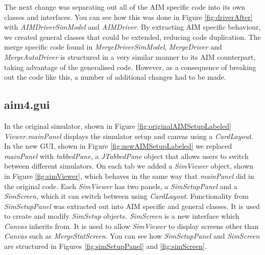 The next change was separating out all of the AIM specific code into its own classes and interfaces. You can see how this was done in Figure \ref{fig:driverAfter} with \emph{AIMDriverSimModel} and \emph{AIMDriver}. By extracting AIM specific behaviour, we created general classes that could be extended, reducing code duplication. The merge specific code found in \emph{MergeDriverSimModel}, \emph{MergeDriver} and \emph{MergeAutoDriver} is structured in a very similar manner to its AIM counterpart, taking advantage of the generalised code. However, as a consequence of breaking out the code like this, a number of additional changes had to be made. 


\subsection{aim4.gui}
\label{subsec:aim4.gui}
In the original simulator, shown in Figure \ref{fig:originalAIMSetupLabeled} \emph{Viewer.mainPanel} displays the simulator setup and canvas using a \emph{CardLayout}. In the new GUI, shown in Figure \ref{fig:newAIMSetupLabeled} we replaced \emph{mainPanel} with \emph{tabbedPane}, a \emph{JTabbedPane} object that allows users to switch between different simulators. On each tab we added a \emph{SimViewer} object, shown in Figure \ref{fig:simViewer}, which behaves in the same way that \emph{mainPanel} did in the original code. Each \emph{SimViewer} has two panels, a \emph{SimSetupPanel} and a \emph{SimScreen}, which it can switch between using \emph{CardLayout}. Functionality from \emph{SimSetupPanel} was extracted out into AIM specific and general classes. It is used to create and modify \emph{SimSetup} objects. \emph{SimScreen} is a new interface which \emph{Canvas} inherits from. It is used to allow \emph{SimViewer} to display screens other than \emph{Canvas} such as \emph{MergeStatScreen}. You can see how \emph{SimSetupPanel} and \emph{SimScreen} are structured in Figures \ref{fig:simSetupPanel} and \ref{fig:simScreen}.

